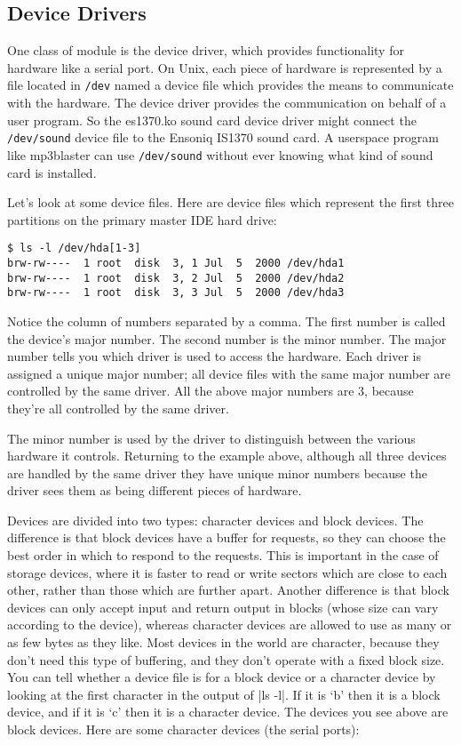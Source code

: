 \documentclass[10pt, oneside]{book}
\begin{document}
\subsection{Device Drivers}
\label{sec:device_drivers}
One class of module is the device driver, which provides functionality for hardware like a serial port.
On Unix, each piece of hardware is represented by a file located in \verb|/dev| named a device file which provides the means to communicate with the hardware.
The device driver provides the communication on behalf of a user program.
So the es1370.ko sound card device driver might connect the \verb|/dev/sound| device file to the Ensoniq IS1370 sound card.
A userspace program like mp3blaster can use \verb|/dev/sound| without ever knowing what kind of sound card is installed.

Let's look at some device files.
Here are device files which represent the first three partitions on the primary master IDE hard drive:

\begin{verbatim}
$ ls -l /dev/hda[1-3]
brw-rw----  1 root  disk  3, 1 Jul  5  2000 /dev/hda1
brw-rw----  1 root  disk  3, 2 Jul  5  2000 /dev/hda2
brw-rw----  1 root  disk  3, 3 Jul  5  2000 /dev/hda3
\end{verbatim}

Notice the column of numbers separated by a comma.
The first number is called the device's major number.
The second number is the minor number.
The major number tells you which driver is used to access the hardware.
Each driver is assigned a unique major number; all device files with the same major number are controlled by the same driver.
All the above major numbers are 3, because they're all controlled by the same driver.

The minor number is used by the driver to distinguish between the various hardware it controls.
Returning to the example above, although all three devices are handled by the same driver they have unique minor numbers because the driver sees them as being different pieces of hardware.

Devices are divided into two types: character devices and block devices.
The difference is that block devices have a buffer for requests, so they can choose the best order in which to respond to the requests.
This is important in the case of storage devices, where it is faster to read or write sectors which are close to each other, rather than those which are further apart.
Another difference is that block devices can only accept input and return output in blocks (whose size can vary according to the device), whereas character devices are allowed to use as many or as few bytes as they like.
Most devices in the world are character, because they don't need this type of buffering, and they don't operate with a fixed block size.
You can tell whether a device file is for a block device or a character device by looking at the first character in the output of \sh|ls -l|.
If it is `b' then it is a block device, and if it is `c' then it is a character device.
The devices you see above are block devices. Here are some character devices (the serial ports):
\end{document}

